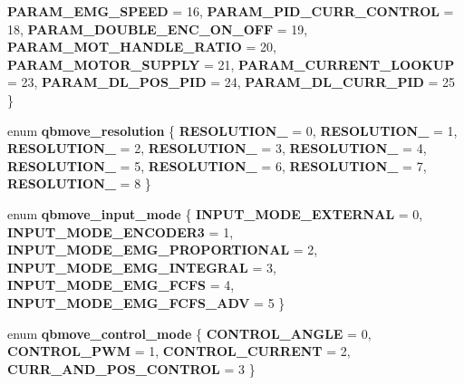 \begin{DoxyCompactItemize}
\textbf{ P\+A\+R\+A\+M\+\_\+\+E\+M\+G\+\_\+\+S\+P\+E\+ED} = 16, 
\textbf{ P\+A\+R\+A\+M\+\_\+\+P\+I\+D\+\_\+\+C\+U\+R\+R\+\_\+\+C\+O\+N\+T\+R\+OL} = 18, 
\textbf{ P\+A\+R\+A\+M\+\_\+\+D\+O\+U\+B\+L\+E\+\_\+\+E\+N\+C\+\_\+\+O\+N\+\_\+\+O\+FF} = 19, 
\textbf{ P\+A\+R\+A\+M\+\_\+\+M\+O\+T\+\_\+\+H\+A\+N\+D\+L\+E\+\_\+\+R\+A\+T\+IO} = 20, 
\newline
\textbf{ P\+A\+R\+A\+M\+\_\+\+M\+O\+T\+O\+R\+\_\+\+S\+U\+P\+P\+LY} = 21, 
\textbf{ P\+A\+R\+A\+M\+\_\+\+C\+U\+R\+R\+E\+N\+T\+\_\+\+L\+O\+O\+K\+UP} = 23, 
\textbf{ P\+A\+R\+A\+M\+\_\+\+D\+L\+\_\+\+P\+O\+S\+\_\+\+P\+ID} = 24, 
\textbf{ P\+A\+R\+A\+M\+\_\+\+D\+L\+\_\+\+C\+U\+R\+R\+\_\+\+P\+ID} = 25
 \}
\item 
\mbox{\label{commands_8h_ad18f2ef316ee226b52882af5758c39e8}} 
enum {\bfseries qbmove\+\_\+resolution} \{ \newline
{\bfseries R\+E\+S\+O\+L\+U\+T\+I\+O\+N\+\_} = 0, 
{\bfseries R\+E\+S\+O\+L\+U\+T\+I\+O\+N\+\_} = 1, 
{\bfseries R\+E\+S\+O\+L\+U\+T\+I\+O\+N\+\_} = 2, 
{\bfseries R\+E\+S\+O\+L\+U\+T\+I\+O\+N\+\_} = 3, 
\newline
{\bfseries R\+E\+S\+O\+L\+U\+T\+I\+O\+N\+\_} = 4, 
{\bfseries R\+E\+S\+O\+L\+U\+T\+I\+O\+N\+\_} = 5, 
{\bfseries R\+E\+S\+O\+L\+U\+T\+I\+O\+N\+\_} = 6, 
{\bfseries R\+E\+S\+O\+L\+U\+T\+I\+O\+N\+\_} = 7, 
\newline
{\bfseries R\+E\+S\+O\+L\+U\+T\+I\+O\+N\+\_} = 8
 \}
\item 
enum \textbf{ qbmove\+\_\+input\+\_\+mode} \{ \newline
\textbf{ I\+N\+P\+U\+T\+\_\+\+M\+O\+D\+E\+\_\+\+E\+X\+T\+E\+R\+N\+AL} = 0, 
\textbf{ I\+N\+P\+U\+T\+\_\+\+M\+O\+D\+E\+\_\+\+E\+N\+C\+O\+D\+E\+R3} = 1, 
\textbf{ I\+N\+P\+U\+T\+\_\+\+M\+O\+D\+E\+\_\+\+E\+M\+G\+\_\+\+P\+R\+O\+P\+O\+R\+T\+I\+O\+N\+AL} = 2, 
\textbf{ I\+N\+P\+U\+T\+\_\+\+M\+O\+D\+E\+\_\+\+E\+M\+G\+\_\+\+I\+N\+T\+E\+G\+R\+AL} = 3, 
\newline
\textbf{ I\+N\+P\+U\+T\+\_\+\+M\+O\+D\+E\+\_\+\+E\+M\+G\+\_\+\+F\+C\+FS} = 4, 
\textbf{ I\+N\+P\+U\+T\+\_\+\+M\+O\+D\+E\+\_\+\+E\+M\+G\+\_\+\+F\+C\+F\+S\+\_\+\+A\+DV} = 5
 \}
\item 
enum \textbf{ qbmove\+\_\+control\+\_\+mode} \{ \textbf{ C\+O\+N\+T\+R\+O\+L\+\_\+\+A\+N\+G\+LE} = 0, 
\textbf{ C\+O\+N\+T\+R\+O\+L\+\_\+\+P\+WM} = 1, 
\textbf{ C\+O\+N\+T\+R\+O\+L\+\_\+\+C\+U\+R\+R\+E\+NT} = 2, 
\textbf{ C\+U\+R\+R\+\_\+\+A\+N\+D\+\_\+\+P\+O\+S\+\_\+\+C\+O\+N\+T\+R\+OL} = 3
 \}
\item 

\end{DoxyCompactItemize}
